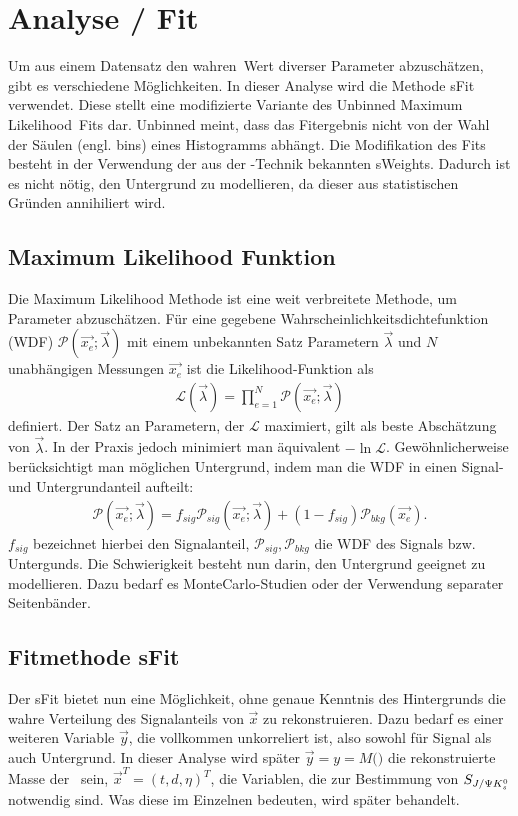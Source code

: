 \chapter{Analyse / Fit} \label{kap:analyse}
Um aus einem Datensatz den \glqq wahren\grqq\ Wert diverser Parameter abzuschätzen, gibt es verschiedene Möglichkeiten. In dieser Analyse wird die Methode sFit verwendet. Diese stellt eine modifizierte Variante des \glqq Unbinned Maximum Likelihood\grqq\ Fits dar. Unbinned meint, dass das Fitergebnis nicht von der Wahl der Säulen (engl. bins) eines Histogramms abhängt. Die Modifikation des Fits besteht in der Verwendung der aus der \SPlot-Technik bekannten sWeights. Dadurch ist es nicht nötig, den Untergrund zu modellieren, da dieser aus statistischen Gründen annihiliert wird.

\section{Maximum Likelihood Funktion}
Die Maximum Likelihood Methode ist eine weit verbreitete Methode, um Parameter abzuschätzen. Für eine gegebene Wahrscheinlichkeitsdichtefunktion (WDF) $\mathcal{P}(\vec{x_e};\vec{\lambda})$ mit einem unbekannten Satz Parametern $\vec{\lambda}$ und $N$ unabhängigen Messungen $\vec{x_e}$ ist die Likelihood-Funktion als
\begin{align}
\mathcal{L}(\vec{\lambda}) = \prod_{e=1}^N \mathcal{P}(\vec{x_e};\vec{\lambda})
\end{align}
definiert. Der Satz an Parametern, der $\mathcal{L}$ maximiert, gilt als beste Abschätzung von $\vec{\lambda}$. In der Praxis jedoch minimiert man äquivalent $-\ln\mathcal{L}$. Gewöhnlicherweise berücksichtigt man möglichen Untergrund, indem man die WDF in einen Signal- und Untergrundanteil aufteilt:
\begin{align}
\mathcal{P}(\vec{x_e};\vec{\lambda}) = f_{sig}\mathcal{P}_{sig}(\vec{x_e};\vec{\lambda}) + (1-f_{sig})\mathcal{P}_{bkg}(\vec{x_e}). \label{eq:likelihood_sig_bkg}
\end{align}
$f_{sig}$ bezeichnet hierbei den Signalanteil, $\mathcal{P}_{sig}, \mathcal{P}_{bkg}$ die WDF des Signals bzw. Untergunds. Die Schwierigkeit besteht nun darin, den Untergrund geeignet zu modellieren. Dazu bedarf es MonteCarlo-Studien oder der Verwendung separater Seitenbänder. \cite{sfit}

\section{Fitmethode sFit} \label{kap:sfit}
Der sFit bietet nun eine Möglichkeit, ohne genaue Kenntnis des Hintergrunds die wahre Verteilung des Signalanteils von $\vec{x}$ zu rekonstruieren. Dazu bedarf es einer weiteren Variable $\vec{y}$, die vollkommen unkorreliert ist, also sowohl für Signal als auch Untergrund. In dieser Analyse wird später $\vec{y} = y = M($\Bd$)$ die rekonstruierte Masse der \Bd\ sein, $\vec{x}^T = (t,d,\eta)^T$, die Variablen, die zur Bestimmung von $S_{J/\Psi K_s^0}$ notwendig sind. Was diese im Einzelnen bedeuten, wird später behandelt.

